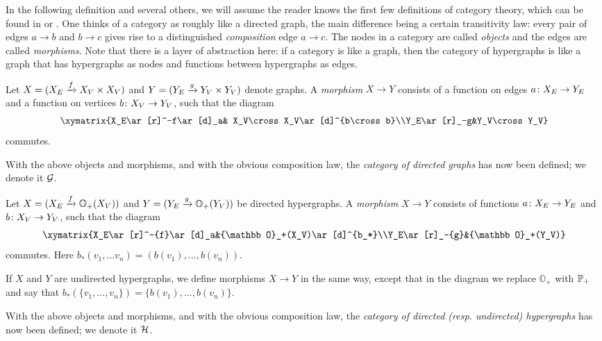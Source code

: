 \documentclass{amsart}
\def\OO{{\mathbb O}}
\begin{document}
In the following definition and several others, we will assume the reader knows the first few definitions of category theory, which can be found in \cite{MacLane} or \cite{Pie}.  One thinks of a category as roughly like a directed graph, the main difference being a certain transitivity law: every pair of edges $a\to b$ and $b\to c$ gives rise to a distinguished {\em composition} edge $a\to c$.  The nodes in a category are called {\em objects} and the edges are called {\em morphisms}.  Note that there is a layer of abstraction here: if a category is like a graph, then the category of hypergraphs is like a graph that has hypergraphs as nodes and functions between hypergraphs as edges. 

\begin{definition}\label{def:cat of graph}

Let $X=(X_E\xrightarrow{f} X_V\times X_V)$ and $Y=(Y_E\xrightarrow{g}Y_V\times Y_V)$ denote graphs.  A {\em morphism} $X\to Y$ consists of a function on edges $a\colon X_E\rightarrow Y_E$ and a function on vertices $b\colon X_V\rightarrow Y_V$, such that the diagram $$\xymatrix{X_E\ar[r]^-f\ar[d]_a& X_V\cross X_V\ar[d]^{b\cross b}\\Y_E\ar[r]_-g&Y_V\cross Y_V}$$ commutes.

With the above objects and morphisms, and with the obvious composition law, the {\em category of directed graphs} has now been defined; we denote it $\mathcal{G}$.

\end{definition}

\begin{definition}\label{def:cat of hyper}

Let $X=(X_E\To{f}\OO_+(X_V))$ and $Y=(Y_E\To{g}\OO_+(Y_V))$ be directed hypergraphs.  A {\em morphism} $X\to Y$ consists of functions $a\colon X_E\rightarrow Y_E$ and $b\colon X_V\rightarrow Y_V$, such that the diagram $$\xymatrix{X_E\ar[r]^-{f}\ar[d]_a&\OO_+(X_V)\ar[d]^{b_*}\\Y_E\ar[r]_-{g}&\OO_+(Y_V)}$$ commutes.  Here $b_*(v_1,\ldots v_n)=(b(v_1),\ldots,b(v_n))$.

If $X$ and $Y$ are undirected hypergraphs, we define morphisms $X\to Y$ in the same way, except that in the diagram we replace $\OO_+$ with ${\mathbb P}_+$ and say that $b_*(\{v_1,\ldots,v_n\})=\{b(v_1),\ldots,b(v_n)\}$.

With the above objects and morphisms, and with the obvious composition law, the {\em category of directed ({\tn resp.} undirected) hypergraphs} has now been defined; we denote it $\mathcal{H}$.

\end{definition}
\end{document}
